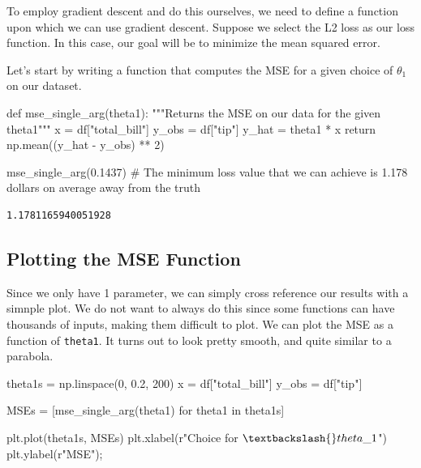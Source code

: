 \documentclass[
  letterpaper,
  DIV=11,
  numbers=noendperiod]{scrreprt}
\newenvironment{Shaded}{\begin{snugshade}}{\end{snugshade}}
\newcommand{\CommentTok}[1]{\textcolor[rgb]{0.37,0.37,0.37}{#1}}
\newcommand{\ControlFlowTok}[1]{\textcolor[rgb]{0.00,0.23,0.31}{#1}}
\newcommand{\DecValTok}[1]{\textcolor[rgb]{0.68,0.00,0.00}{#1}}
\newcommand{\FloatTok}[1]{\textcolor[rgb]{0.68,0.00,0.00}{#1}}
\newcommand{\KeywordTok}[1]{\textcolor[rgb]{0.00,0.23,0.31}{#1}}
\newcommand{\NormalTok}[1]{\textcolor[rgb]{0.00,0.23,0.31}{#1}}
\newcommand{\OperatorTok}[1]{\textcolor[rgb]{0.37,0.37,0.37}{#1}}
\newcommand{\StringTok}[1]{\textcolor[rgb]{0.13,0.47,0.30}{#1}}
\newcommand{\VerbatimStringTok}[1]{\textcolor[rgb]{0.13,0.47,0.30}{#1}}
\begin{document}
To employ gradient descent and do this ourselves, we need to define a
function upon which we can use gradient descent. Suppose we select the
L2 loss as our loss function. In this case, our goal will be to minimize
the mean squared error.

Let's start by writing a function that computes the MSE for a given
choice of \(\theta_1\) on our dataset.

\begin{Shaded}
\begin{Highlighting}[]
\KeywordTok{def}\NormalTok{ mse\_single\_arg(theta1):}
    \CommentTok{"""Returns the MSE on our data for the given theta1"""}
\NormalTok{    x }\OperatorTok{=}\NormalTok{ df[}\StringTok{"total\_bill"}\NormalTok{]}
\NormalTok{    y\_obs }\OperatorTok{=}\NormalTok{ df[}\StringTok{"tip"}\NormalTok{]}
\NormalTok{    y\_hat }\OperatorTok{=}\NormalTok{ theta1 }\OperatorTok{*}\NormalTok{ x}
    \ControlFlowTok{return}\NormalTok{ np.mean((y\_hat }\OperatorTok{{-}}\NormalTok{ y\_obs) }\OperatorTok{**} \DecValTok{2}\NormalTok{)}

\NormalTok{mse\_single\_arg(}\FloatTok{0.1437}\NormalTok{)}
\CommentTok{\# The minimum loss value that we can achieve is 1.178 dollars on average away from the truth}
\end{Highlighting}
\end{Shaded}

\begin{verbatim}
1.1781165940051928
\end{verbatim}

\hypertarget{plotting-the-mse-function}{%
\subsection{Plotting the MSE Function}\label{plotting-the-mse-function}}

Since we only have 1 parameter, we can simply cross reference our
results with a simnple plot. We do not want to always do this since some
functions can have thousands of inputs, making them difficult to plot.
We can plot the MSE as a function of \texttt{theta1}. It turns out to
look pretty smooth, and quite similar to a parabola.

\begin{Shaded}
\begin{Highlighting}[]
\NormalTok{theta1s }\OperatorTok{=}\NormalTok{ np.linspace(}\DecValTok{0}\NormalTok{, }\FloatTok{0.2}\NormalTok{, }\DecValTok{200}\NormalTok{)}
\NormalTok{x }\OperatorTok{=}\NormalTok{ df[}\StringTok{"total\_bill"}\NormalTok{]}
\NormalTok{y\_obs }\OperatorTok{=}\NormalTok{ df[}\StringTok{"tip"}\NormalTok{]}

\NormalTok{MSEs }\OperatorTok{=}\NormalTok{ [mse\_single\_arg(theta1) }\ControlFlowTok{for}\NormalTok{ theta1 }\KeywordTok{in}\NormalTok{ theta1s]}

\NormalTok{plt.plot(theta1s, MSEs)}
\NormalTok{plt.xlabel(}\VerbatimStringTok{r"Choice for $\textbackslash{}theta\_1$"}\NormalTok{)}
\NormalTok{plt.ylabel(}\VerbatimStringTok{r"MSE"}\NormalTok{)}\OperatorTok{;}
\end{Highlighting}
\end{Shaded}
\end{document}
